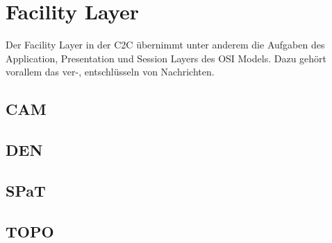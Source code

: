 \chapter{Facility Layer \label{chap:facilitylayer}}
Der Facility Layer in der \ac{C2C} übernimmt unter anderem die Aufgaben des Application, Presentation und Session Layers des OSI Models. Dazu gehört vorallem das ver-, entschlüsseln von Nachrichten. 


\section{CAM\label{sec:cam}}

\section{DEN\label{sec:den}}


\section{SPaT\label{sec:spat}}

\section{TOPO\label{sec:topo}}
